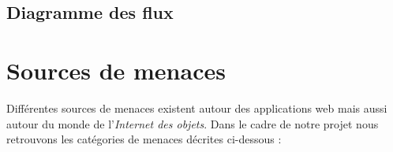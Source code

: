 \documentclass[12pt]{article}
\begin{document}
\subsection{Diagramme des flux}
\label{ssec:diagramme}

\clearpage
\section{Sources de menaces}

Différentes sources de menaces existent autour des applications web mais aussi autour du monde de l'\emph{Internet des objets}. Dans le cadre de notre projet nous retrouvons les catégories de menaces décrites ci-dessous :
\end{document}
